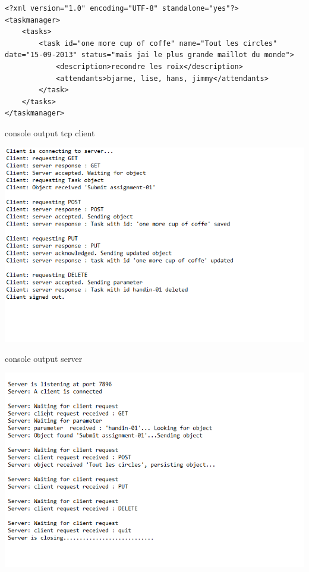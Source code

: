 \begin{lstlisting}[caption=xml after PUT]
<?xml version="1.0" encoding="UTF-8" standalone="yes"?>
<taskmanager>
	<tasks>
		<task id="one more cup of coffe" name="Tout les circles" date="15-09-2013" status="mais jai le plus grande maillot du monde">
			<description>recondre les roix</description>
			<attendants>bjarne, lise, hans, jimmy</attendants>
		</task>
	</tasks>
</taskmanager>
\end{lstlisting}



\begin{center}
\centering
\caption{console output tcp client}
\includegraphics[scale=0.7]{images/TCP_run_client.png}
\end{center}
\vspace{10pt}


\begin{center}
\centering
\caption{console output server}
\includegraphics[scale=0.7]{images/TCP_run_server.png}
\end{center}
\vspace{10pt}


